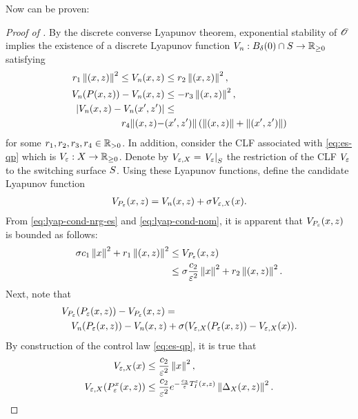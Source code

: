 \documentclass[twocolumn]{article}
\begin{document}
Now  can be proven:
\begin{proof} [Proof of ]
  By the discrete converse Lyapunov theorem, exponential stability of $\Orbit$ implies the existence of a discrete Lyapunov function $\Vn : B_{\delta}(0) \cap \S \to \Rnn$ satisfying
  \begin{align}
    \label{eq:lyap-cond-nom}
    r_{1} \nzdxz^{2} \leq \Vn\argsxz &\leq r_{2} \nzdxz^2,\\
    \nonumber
    \Vn(\P\argsxz) - \Vn\argsxz &\leq -r_{3} \nzdxz^{2},\\
    \nonumber
    | \Vn\argsxz - \Vn(\zdx', \zdz') | &\leq\\
    \nonumber
    r_{4} \| \argsxz - &\argsxzprime \| \left( \nzdxz + \nzdxzprime\right)
  \end{align}
  for some $r_{1}, r_{2}, r_{3}, r_{4} \in \Rpd$.
  In addition, consider the CLF associated with \eqref{eq:es-qp} which is $\Ve : \zdX \to \Rnn$.
  Denote by $\Vex = \VeS$ the restriction of the CLF $\Ve$ to the switching surface $\S$.
  Using these Lyapunov functions, define the candidate Lyapunov function
  \begin{align}
    \VP\argsxz = \Vn\argsxz + \sigma \Vex(\zdx).
  \end{align}
  From \eqref{eq:lyap-cond-nrg-es} and \eqref{eq:lyap-cond-nom}, it is apparent that $\VP\argsxz$ is bounded as follows:
  \begin{align}
    \sigma c_{1} \nzdx^{2} + r_{1} \nzdxz^{2} &\leq \VP\argsxz\\
    \nonumber
    &\leq \sigma \frac{c_{2}}{\resclfparam^{2}} \nzdx^{2} + r_{2} \nzdxz^{2}.
  \end{align}
  Next, note that
  \begin{align}
    \label{eq:composite-lyap}
    \lefteqn{\VP(\Pe\argsxz) - \VP\argsxz =}\\
    \nonumber
    &&\Vn(\Pe\argsxz) - \Vn\argsxz + \sigma(\Vex(\Pe\argsxz) - \Vex(\zdx)).
  \end{align}
  By construction of the control law \eqref{eq:es-qp}, it is true that
  \begin{align}
    \label{eq:Veh-bound}
    \Vex(\zdx) &\leq \frac{c_{2}}{\resclfparam^{2}} \left\| \zdx \right\|^{2},\\
    \nonumber
    \Vex(\Pe^{\zdx}\argsxz) &\leq \frac{c_{2}}{\resclfparam^{2}} e^{-\frac{c_{3}}{\resclfparam} \TIe\argsxz} \left\| \DeltaX\argsxz \right\|^{2}.
  \end{align}

\end{proof}
\end{document}
